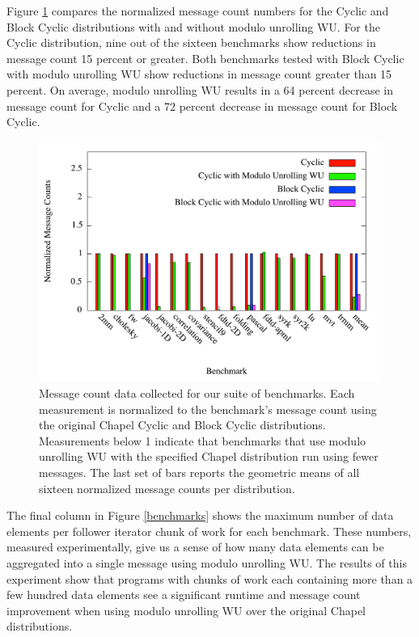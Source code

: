 Figure \ref{message_counts} compares the normalized message count numbers for the Cyclic and Block Cyclic distributions with and without modulo unrolling WU. For the Cyclic distribution, nine out of the sixteen benchmarks show reductions in message count 15 percent or greater. Both benchmarks tested with Block Cyclic with modulo unrolling WU show reductions in message count greater than 15 percent. On average, modulo unrolling WU results in a 64 percent decrease in message count for Cyclic and a 72 percent decrease in message count for Block Cyclic. 

\begin{figure}
\begin{center}
\includegraphics[width=\linewidth]{./Figures/message_counts}
\caption{Message count data collected for our suite of benchmarks. Each measurement is normalized to the benchmark's message count using the original Chapel Cyclic and Block Cyclic distributions. Measurements below 1 indicate that benchmarks that use modulo unrolling WU with the specified Chapel distribution run using fewer messages. The last set of bars reports the geometric means of all sixteen normalized message counts per distribution.}
\label{message_counts}
\end{center}
\end{figure}

The final column in Figure \ref{benchmarks} shows the maximum number of data elements per follower iterator chunk of work for each benchmark. These numbers, measured experimentally, give us a sense of how many data elements can be aggregated into a single message using modulo unrolling WU. The results of this experiment show that programs with chunks of work each containing more than a few hundred data elements see a significant runtime and message count improvement when using modulo unrolling WU over the original Chapel distributions. 

